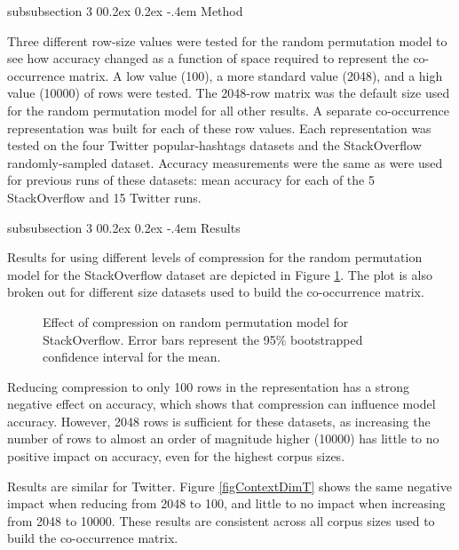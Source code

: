 \documentclass[man,floatsintext,donotrepeattitle]{apa6}
\makeatletter
\renewcommand{\subsubsection}{%
  \@startsection
  {subsubsection}%
  {3}%
  {\parindent}%
  {0\baselineskip \@plus 0.2ex \@minus 0.2ex}%
  {-.4em}%
  {\normalfont\normalsize\bfseries\addperi}}
\makeatother
\begin{document}
\subsubsection{Method}

Three different row-size values were tested for the random permutation model to see how accuracy changed as a function of space required to represent the co-occurrence matrix.
A low value (\num{100}), a more standard value (\num{2048}), and a high value (\num{10000}) of rows were tested.
The \num{2048}-row matrix was the default size used for the random permutation model for all other results.
A separate co-occurrence representation was built for each of these row values.
Each representation was tested on the four Twitter popular-hashtags datasets and the StackOverflow randomly-sampled dataset.
Accuracy measurements were the same as were used for previous runs of these datasets: mean accuracy for each of the 5 StackOverflow and 15 Twitter runs.

\subsubsection{Results}

Results for using different levels of compression for the random permutation model for the StackOverflow dataset are depicted in Figure \ref{figContextDimSO}.
The plot is also broken out for different size datasets used to build the co-occurrence matrix.

\begin{figure}[!htbp]
  \caption{
    Effect of compression on random permutation model for StackOverflow.
    Error bars represent the 95\% bootstrapped confidence interval for the mean.
  }
  \label{figContextDimSO}
\end{figure}

Reducing compression to only 100 rows in the representation has a strong negative effect on accuracy, which shows that compression can influence model accuracy.
However, \num{2048} rows is sufficient for these datasets, as increasing the number of rows to almost an order of magnitude higher (\num{10000}) has little to no positive impact on accuracy, even for the highest corpus sizes.

Results are similar for Twitter.
Figure \ref{figContextDimT} shows the same negative impact when reducing from \num{2048} to \num{100}, and little to no impact when increasing from \num{2048} to \num{10000}. 
These results are consistent across all corpus sizes used to build the co-occurrence matrix.
\end{document}
